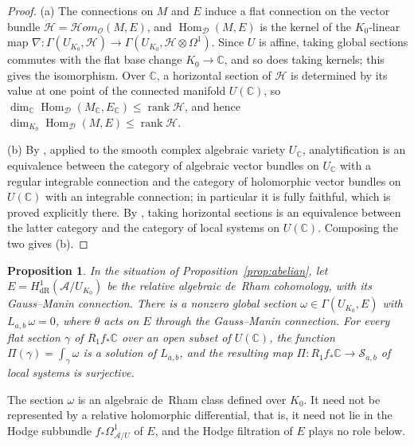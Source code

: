 \documentclass[11pt]{amsart}
\newtheorem{proposition}[theorem]{Proposition}
\theoremstyle{definition}
\theoremstyle{remark}
\numberwithin{equation}{section}
\newcommand{\C}{\mathbb{C}}
\newcommand{\cS}{\mathcal{S}}
\newcommand{\cO}{\mathcal{O}}
\newcommand{\cD}{\mathcal{D}}
\newcommand{\cA}{\mathcal{A}}
\DeclareMathOperator{\Hom}{Hom}
\DeclareMathOperator{\rank}{rank}
\newcommand{\Sab}{\cS_{a,b}}
\begin{document}
\begin{proof}
(a) The connections on $M$ and $E$ induce a flat connection on the vector bundle $\mathcal H=\mathcal Hom_\cO(M,E)$, and $\Hom_\cD(M,E)$ is the kernel of the $K_0$-linear map $\nabla:\Gamma(U_{K_0},\mathcal H)\to\Gamma(U_{K_0},\mathcal H\otimes\Omega^1)$. Since $U$ is affine, taking global sections commutes with the flat base change $K_0\to\C$, and so does taking kernels; this gives the isomorphism. Over $\C$, a horizontal section of $\mathcal H$ is determined by its value at one point of the connected manifold $U(\C)$, so $\dim_\C\Hom_\cD(M_\C,E_\C)\le\rank\mathcal H$, and hence $\dim_{K_0}\Hom_\cD(M,E)\le\rank\mathcal H$.

(b) By \citet[Th\'eor\`eme~II.5.9]{Deligne1970}, applied to the smooth complex algebraic variety $U_\C$, analytification is an equivalence between the category of algebraic vector bundles on $U_\C$ with a regular integrable connection and the category of holomorphic vector bundles on $U(\C)$ with an integrable connection; in particular it is fully faithful, which is proved explicitly there. By \citet[Th\'eor\`eme~I.2.17]{Deligne1970}, taking horizontal sections is an equivalence between the latter category and the category of local systems on $U(\C)$. Composing the two gives (b).
\end{proof}

\begin{proposition}\label{prop:period}
In the situation of Proposition~\ref{prop:abelian}, let $E=H^1_{\mathrm{dR}}(\cA/U_{K_0})$ be the relative algebraic de~Rham cohomology, with its Gauss--Manin connection. There is a nonzero global section $\omega\in\Gamma(U_{K_0},E)$ with $L_{a,b}\,\omega=0$, where $\theta$ acts on $E$ through the Gauss--Manin connection. For every flat section $\gamma$ of $R_1f_*\C$ over an open subset of $U(\C)$, the function $\Pi(\gamma)=\int_\gamma\omega$ is a solution of $L_{a,b}$, and the resulting map $\Pi:R_1f_*\C\to\Sab$ of local systems is surjective.
\end{proposition}

The section $\omega$ is an algebraic de~Rham class defined over $K_0$. It need not be represented by a relative holomorphic differential, that is, it need not lie in the Hodge subbundle $f_*\Omega^1_{\cA/U}$ of $E$, and the Hodge filtration of $E$ plays no role below.
\end{document}
